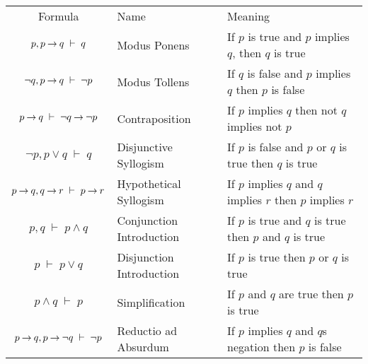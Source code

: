 \medskip
\begin{tabular}{c l l}
\label{Tab:RulesOfInference}
  Formula          & Name                  & Meaning      \\
  
  $p, p \mathbin{\rightarrow} q \;\vdash\; q$                                  & 
  Modus Ponens                                                  & 
  If $p$ is true and $p$ implies $q$, then $q$ is true          \\   
  
  $\neg q, p \mathbin{\rightarrow} q \;\vdash\; \neg p$                        & 
  Modus Tollens                                                 & 
  If $q$ is false and $p$ implies $q$ then $p$ is false         \\     
  
  $p \mathbin{\rightarrow} q \;\vdash\; \neg q \mathbin{\rightarrow} \neg p$                   & 
  Contraposition                                                & 
  If $p$ implies $q$ then not $q$ implies not $p$               \\   
  
  $\neg p, p \vee q \;\vdash\; q$                              & 
  Disjunctive Syllogism                                         & 
  If $p$ is false and $p$ or $q$ is true then $q$ is true       \\ 
  
  $p \mathbin{\rightarrow} q,  q \mathbin{\rightarrow} r \;\vdash\; p \mathbin{\rightarrow} r$                 & 
  Hypothetical Syllogism                                        & 
  If $p$ implies $q$ and $q$ implies $r$ then $p$ implies $r$   \\   
  
  $p,q \;\vdash\; p \wedge q$                                  & 
  Conjunction Introduction                                      & 
  If $p$ is true and $q$ is true then $p$ and $q$ is true       \\ 
  
  $p \;\vdash\; p \vee q$                                      & 
  Disjunction Introduction                                      & 
  If $p$ is true then $p$ or $q$ is true                        \\    
  
  $p \wedge q \;\vdash\; p$                                    & 
  Simplification                                                & 
  If $p$ and $q$ are true then $p$ is true                      \\    
  
  $p \mathbin{\rightarrow} q, p \mathbin{\rightarrow} \neg q \;\vdash\; \neg p$                & 
  Reductio ad Absurdum                                          & 
  If $p$ implies $q$ and $q$s negation then $p$ is false         \\ 
  

\end{tabular}
